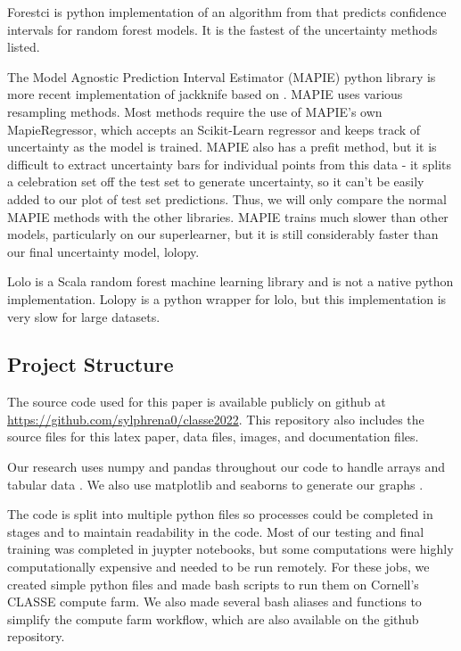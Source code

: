 \documentclass[twocolumn, nofootinbib, secnumarabic, amssymb, nobibnotes, aps, prd]{revtex4-2}
\begin{document}
Forestci is python implementation of an algorithm from \cite{Wager2014} that predicts confidence intervals for random forest models. It is the fastest of the uncertainty methods listed. 

The Model Agnostic Prediction Interval Estimator (MAPIE) python library is more recent implementation of jackknife based on \cite{Foygel2020}. MAPIE uses various resampling methods. Most methods require the use of MAPIE's own MapieRegressor, which accepts an Scikit-Learn regressor and keeps track of uncertainty as the model is trained. MAPIE also has a prefit method, but it is difficult to extract uncertainty bars for individual points from this data - it splits a celebration set off the test set to generate uncertainty, so it can't be easily added to our plot of test set predictions. Thus, we will only compare the normal MAPIE methods with the other libraries. MAPIE trains much slower than other models, particularly on our superlearner, but it is still considerably faster than our final uncertainty model, lolopy.

Lolo is a Scala random forest machine learning library and is not a native python implementation. Lolopy is a python wrapper for lolo, but this implementation is very slow for large datasets. 

\subsection{Project Structure} %
The source code used for this paper is available publicly on github at \url{https://github.com/sylphrena0/classe2022}. This repository also includes the source files for this latex paper, data files, images, and documentation files.

Our research uses numpy and pandas throughout our code to handle arrays and tabular data \cite{Harris2020array, Reback2020pandas}. We also use matplotlib and seaborns to generate our graphs \cite{Hunter2007, Waskom2021}.

The code is split into multiple python files so processes could be completed in stages and to maintain readability in the code. Most of our testing and final training was completed in juypter notebooks, but some computations were highly computationally expensive and needed to be run remotely. For these jobs, we created simple python files and made bash scripts to run them on Cornell's CLASSE compute farm. We also made several bash aliases and functions to simplify the compute farm workflow, which are also available on the github repository. 
\end{document}
